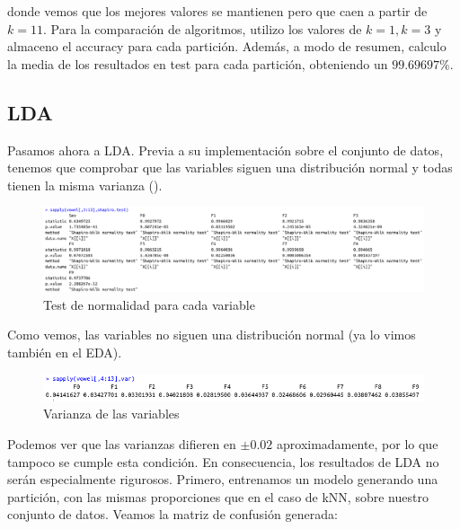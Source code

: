 donde vemos que los mejores valores se mantienen pero que caen a partir de $k=11$. Para la comparación de algoritmos, utilizo los valores de $k=1, k=3$ y almaceno el accuracy para cada partición. Además, a modo de resumen, calculo la media de los resultados en test para cada partición, obteniendo un $99.69697\%$.



\subsection{LDA}

Pasamos ahora a LDA. Previa a su implementación sobre el conjunto de datos, tenemos que comprobar que las variables siguen una distribución normal y todas tienen la misma varianza (\cite{regresion}).

\begin{figure}[H] %
	\centering
	\includegraphics[scale=0.6]{shapiro-lda.png}  %
	\caption{Test de normalidad para cada variable} 
	\label{fig:shapiro-lda}
\end{figure}

Como vemos, las variables no siguen una distribución normal (ya lo vimos también en el EDA).

\begin{figure}[H] %
	\centering
	\includegraphics[scale=0.6]{var-lda.png}  %
	\caption{Varianza de las variables} 
	\label{fig:var-lda}
\end{figure}

Podemos ver que las varianzas difieren en $\pm 0.02$ aproximadamente, por lo que tampoco se cumple esta condición. En consecuencia, los resultados de LDA no serán especialmente rigurosos. Primero, entrenamos un modelo generando una partición, con las mismas proporciones que en el caso de kNN, sobre nuestro conjunto de datos.  Veamos la matriz de confusión generada:

